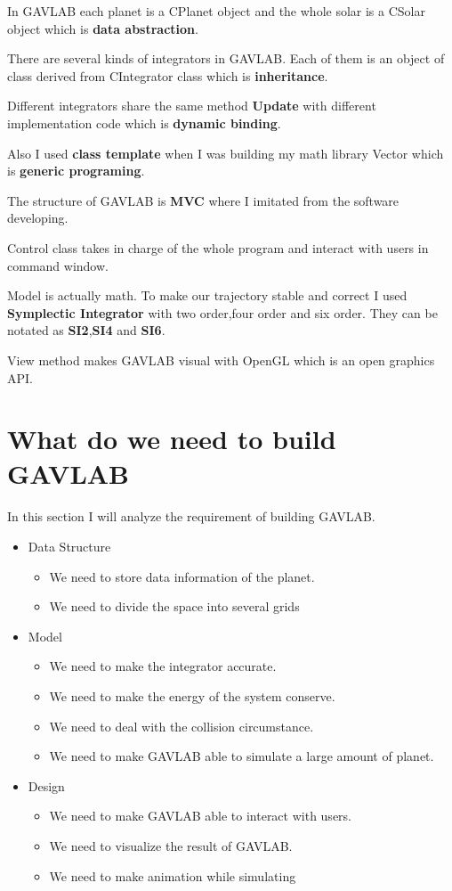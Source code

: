 \documentclass[12pt]{article}
\begin{document}
In GAVLAB each planet is a CPlanet object and the whole solar is a CSolar object which is \textbf{data abstraction}.

There are several kinds of integrators in GAVLAB.
Each of them is an object of class derived from CIntegrator class which is \textbf{inheritance}.

Different integrators share the same method \textbf{Update} with different implementation code which is \textbf{dynamic binding}.

Also I used \textbf{class template} when I was building my math library Vector which is \textbf{generic programing}.

The structure of GAVLAB is \textbf{MVC} where I imitated from the software developing.

Control class takes in charge of the whole program and interact with users in command window.

Model is actually math.
To make our trajectory stable and correct I used \textbf{Symplectic Integrator} with two order,four order and six order.
They can be notated as \textbf{SI2},\textbf{SI4} and \textbf{SI6}.

View method makes GAVLAB visual with OpenGL which is an open graphics API.

\clearpage
\section{What do we need to build GAVLAB}
In this section I will analyze the requirement of building GAVLAB.
\begin{itemize}
\item Data Structure

	\begin{itemize}
		\item We need to store data information of the planet.
		\item We need to divide the space into several grids
	\end{itemize}
\item Model

	\begin{itemize}
		\item We need to make the integrator accurate.
		\item We need to make the energy of the system conserve.
		\item We need to deal with the collision circumstance.
		\item We need to make GAVLAB able to simulate a large amount of planet.
	\end{itemize}
\item Design

	\begin{itemize}
		\item We need to make GAVLAB able to interact with users.
		\item We need to visualize the result of GAVLAB.
		\item We need to make animation while simulating
	\end{itemize}
\end{itemize}
\end{document}
